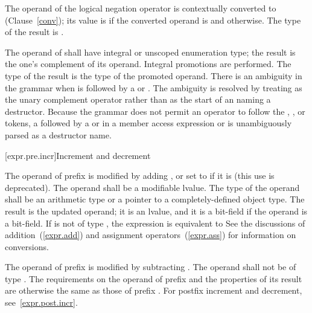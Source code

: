 \pnum
{}%
The operand of the logical negation operator \tcode{!} is contextually
converted to 
(Clause~\ref{conv}); its value is 
if the converted operand is  and  otherwise.
The type of the result is .

\pnum
{}%
The operand of \tcode{\~{}} shall have integral or unscoped enumeration type; the
result is the one's complement of its operand. Integral promotions are
performed. The type of the result is the type of the promoted operand.
There is an ambiguity
in the grammar when \tcode{\~{}} is followed by
a  or .
The ambiguity is resolved by treating \tcode{\~{}} as the unary complement
operator rather than as the start of an 
naming a destructor.
\enternote
Because the grammar does not permit an operator to follow the
, \tcode{->}, or \tcode{::} tokens, a \tcode{\~{}} followed by
a  or  in a
member access expression or  is
unambiguously parsed as a destructor name.
\exitnote

[expr.pre.incr]{Increment and decrement}

\pnum
{}%
%
The operand of prefix \tcode{++}
%
%
is modified by adding ,
%
%
%
or set to  if it is  (this use is deprecated).
The operand shall be a modifiable lvalue. The type of the operand shall
be an arithmetic type or a pointer to a completely-defined object type.
The result is the updated operand; it is an lvalue, and it is a
bit-field if the operand is a bit-field. If  is not of type
, the expression  is equivalent to 
%
\enternote
See the discussions of addition~(\ref{expr.add}) and assignment
operators~(\ref{expr.ass}) for information on conversions.
\exitnote 

\pnum
The operand of prefix
%
\tcode{\dcr} is modified by subtracting . The operand shall not
be of type . The requirements on the operand of prefix
\tcode{\dcr} and the properties of its result are otherwise the same as
those of prefix \tcode{++}.
\enternote 
For postfix increment and decrement, see~\ref{expr.post.incr}.
\exitnote 

